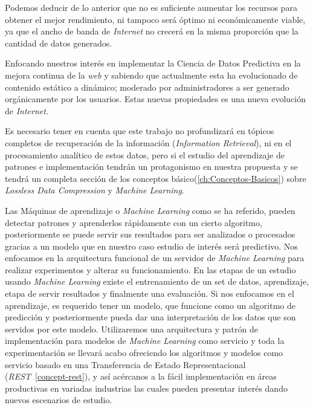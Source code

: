 	Podemos deducir de lo anterior que no es suficiente aumentar los recursos para obtener el mejor rendimiento, ni tampoco será óptimo ni económicamente viable, ya que el ancho de banda de \emph{Internet} no crecerá en la misma proporción que la cantidad de datos generados.

	Enfocando nuestros interés en implementar  la Ciencia de Datos Predictiva en la mejora continua de la \emph{web} y sabiendo que  actualmente esta ha evolucionado de  contenido estático a dinámico; moderado por administradores a ser  generado orgánicamente por los usuarios. Estas nuevas propiedades es una nueva evolución de \emph{Internet}. 
	
	Es necesario tener en cuenta que este trabajo no profundizará en tópicos completos de recuperación de la información (\emph{Information Retrieval}), ni en el procesamiento analítico de estos datos, pero si el estudio del aprendizaje de patrones e implementación tendrán un protagonismo en nuestra propuesta y se tendrá un completa sección de los conceptos básico(\ref{ch:Conceptos-Basicos}) sobre \emph{Lossless Data Compression} y \emph{Machine Learning}.

	Las Máquinas de aprendizaje o \emph{Machine Learning} como se ha referido, pueden detectar patrones y aprenderlos rápidamente con un cierto algoritmo, posteriormente se puede servir sus resultados para ser analizados o procesados gracias a un modelo que en nuestro caso estudio de interés será predictivo. Nos enfocamos en la arquitectura funcional de un servidor de \emph{Machine Learning} para realizar experimentos y alterar su funcionamiento. En las etapas de un estudio usando \emph{Machine Learning} existe el entrenamiento de un set de datos, aprendizaje, etapa de servir resultados y finalmente una evaluación.  Si nos enfocamos en el aprendizaje, es requerido tener un modelo, que funcione como un algoritmo de predicción y posteriormente pueda dar una interpretación de los datos que son servidos por este modelo. Utilizaremos una arquitectura y patrón de implementación para modelos de \emph{Machine Learning} como servicio y toda la experimentación se llevará acabo ofreciendo los algoritmos y modelos como servicio basado en una Transferencia de Estado Representacional (\emph{REST}~\ref{concept-rest}), y así acércanos a la fácil implementación en áreas productivas en variadas industrias las cuales pueden presentar interés dando nuevos escenarios de estudio.

	

